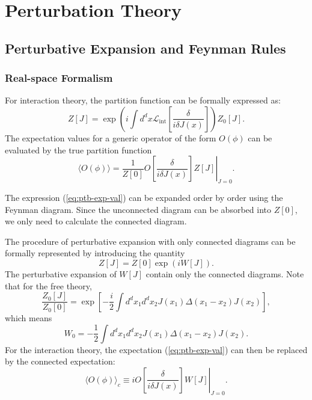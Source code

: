 \section{Perturbation Theory}

\subsection{Perturbative Expansion and Feynman Rules}
\subsubsection{Real-space Formalism}
For interaction theory, the partition function can be formally expressed as:
\begin{equation}
	Z[J] = \exp\left(i\int d^dx \mathcal{L}_{\mathrm{int}}\left[\frac{\delta}{i\delta J(x)}\right]\right)Z_0[J].
\end{equation}
The expectation values for a generic operator of the form $O(\phi)$ can be evaluated by the true partition function
\begin{equation}\label{eq:ptb-exp-val}
	\langle O(\phi)\rangle
	= \frac{1}{Z[0]} \left. O\left[\frac{\delta}{i\delta J(x)}\right] Z[J] \right|_{J=0}.
\end{equation}

The expression (\ref{eq:ptb-exp-val}) can be expanded order by order using the Feynman diagram. 
Since the unconnected diagram can be absorbed into $Z[0]$, we only need to calculate the connected diagram.

The procedure of perturbative expansion with only connected diagrams can be formally represented by introducing the quantity
\begin{equation}
	Z[J] = Z[0]\exp\left(i W[J]\right).
\end{equation}
The perturbative expansion of $W[J]$ contain only the connected diagrams.
Note that for the free theory,
\begin{equation*}
	\frac{Z_0[J]}{Z_0[0]} = \exp\left[-\frac{i}{2}\int d^d x_1 d^d x_2 J(x_1) \Delta(x_1-x_2)J(x_2)\right],
\end{equation*}
which means
\begin{equation*}
	W_0 = -\frac{1}{2}\int d^d x_1 d^d x_2 J(x_1) \Delta(x_1-x_2)J(x_2).
\end{equation*}
For the interaction theory, the expectation (\ref{eq:ptb-exp-val}) can then be replaced by the connected expectation:
\begin{equation}
	\langle O(\phi)\rangle_c
	\equiv i\left. O\left[\frac{\delta}{i\delta J(x)}\right] W[J] \right|_{J=0}.
\end{equation}


